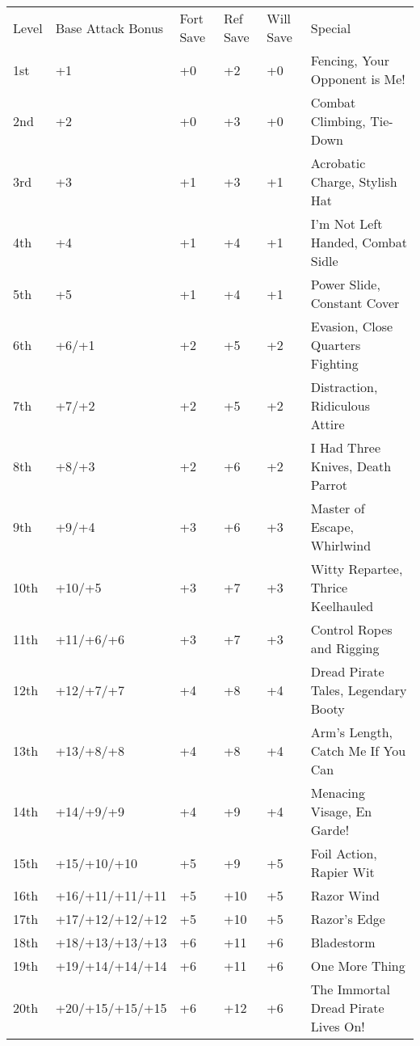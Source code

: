\begin{table}[tbh]
\begin{small}
\begin{tabular}{lp{3cm}p{0.7cm}p{0.7cm}p{0.7cm}l}
Level  &Base Attack Bonus &Fort Save &Ref Save &Will Save &Special\\
1st  &+1              &+0 &+2  &+0 & Fencing, Your Opponent is Me! \\
2nd  &+2              &+0 &+3  &+0 & Combat Climbing, Tie-Down \\
3rd  &+3              &+1 &+3  &+1 & Acrobatic Charge, Stylish Hat \\
4th  &+4              &+1 &+4  &+1 & I'm Not Left Handed, Combat Sidle \\
5th  &+5              &+1 &+4  &+1 & Power Slide, Constant Cover \\
6th  &+6/+1           &+2 &+5  &+2 & Evasion, Close Quarters Fighting \\
7th  &+7/+2           &+2 &+5  &+2 & Distraction, Ridiculous Attire \\
8th  &+8/+3           &+2 &+6  &+2 & I Had Three Knives, Death Parrot \\
9th  &+9/+4           &+3 &+6  &+3 & Master of Escape, Whirlwind \\
10th &+10/+5          &+3 &+7  &+3 & Witty Repartee, Thrice Keelhauled \\
11th &+11/+6/+6       &+3 &+7  &+3 & Control Ropes and Rigging \\
12th &+12/+7/+7       &+4 &+8  &+4 & Dread Pirate Tales, Legendary Booty \\
13th &+13/+8/+8       &+4 &+8  &+4 & Arm's Length, Catch Me If You Can \\
14th &+14/+9/+9       &+4 &+9  &+4 & Menacing Visage, En Garde! \\
15th &+15/+10/+10     &+5 &+9  &+5 & Foil Action, Rapier Wit \\
16th &+16/+11/+11/+11 &+5 &+10 &+5 & Razor Wind \\
17th &+17/+12/+12/+12 &+5 &+10 &+5 & Razor's Edge \\
18th &+18/+13/+13/+13 &+6 &+11 &+6 & Bladestorm \\
19th &+19/+14/+14/+14 &+6 &+11 &+6 & One More Thing \\
20th &+20/+15/+15/+15 &+6 &+12 &+6 & The Immortal Dread Pirate Lives On! \\
\end{tabular}
\end{small}
\end{table}

